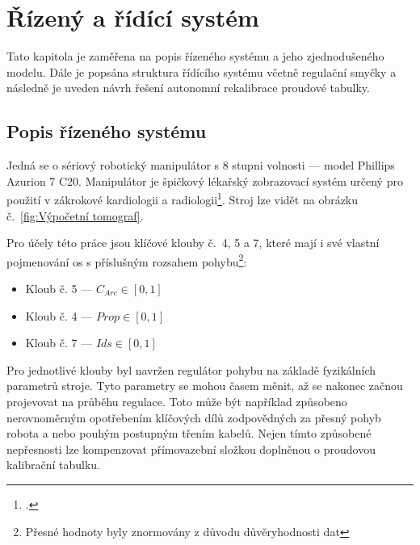 \section{Řízený a řídící systém}\label{section: řízený a říddící systém}
Tato kapitola je zaměřena na popis řízeného systému a jeho zjednodušeného modelu. Dále je popsána struktura řídícího systému včetně regulační smyčky a následně je uveden návrh řešení autonomní rekalibrace proudové tabulky.
\subsection{Popis řízeného systému}
Jedná se o sériový robotický manipulátor s 8 stupni volnosti --- model Phillips Azurion 7 C20. Manipulátor je špičkový lékařský zobrazovací systém určený pro použití v zákrokové kardiologii a radiologii\footcite{AzurionPage}. Stroj lze vidět na obrázku č.~\ref{fig:Výpočetní tomograf}.\par
Pro účely této práce jsou klíčové klouby č.~4, 5 a 7, které mají i své vlastní pojmenování os s příslušným rozsahem pohybu\footnote{Přesné hodnoty byly znormovány z důvodu důvěryhodnosti dat}:
\begin{itemize}
    \item Kloub č. 5 --- $C_{Arc}\in[0, 1]$
    \item Kloub č. 4 --- $Prop\in[0, 1]$
    \item Kloub č. 7 --- $Ids\in[0, 1]$
\end{itemize}
Pro jednotlivé klouby byl navržen regulátor pohybu na základě fyzikálních parametrů stroje. Tyto parametry se mohou časem měnit, až se nakonec začnou projevovat na průběhu regulace. Toto může být například způsobeno nerovnoměrným opotřebením klíčových dílů zodpovědných za přesný pohyb robota a nebo pouhým postupným třením kabelů. Nejen tímto způsobené nepřesnosti lze kompenzovat přímovazební složkou doplněnou o proudovou kalibrační tabulku.


